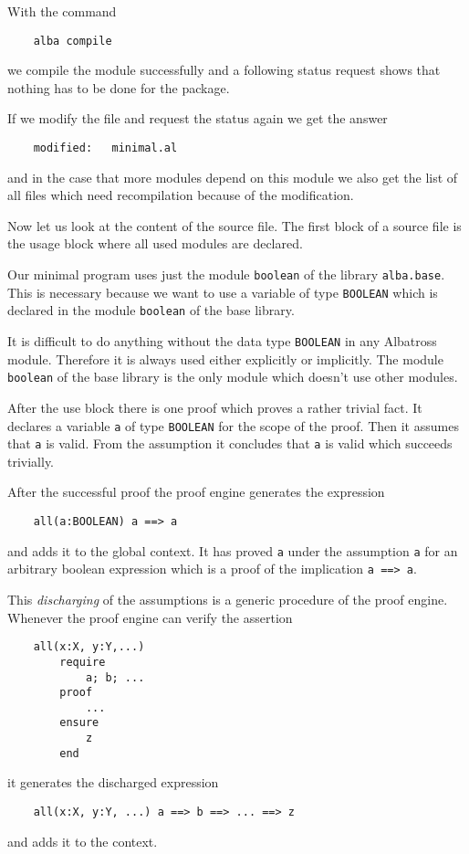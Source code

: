 With the command
\begin{lstlisting}
    alba compile
\end{lstlisting}
we compile the module successfully and a following status request shows that
nothing has to be done for the package.

If we modify the file and request the status again we get the answer
\begin{lstlisting}
    modified:   minimal.al
\end{lstlisting}
and in the case that more modules depend on this module we also get the list
of all files which need recompilation because of the modification.

Now let us look at the content of the source file. The first block of a source
file is the usage block where all used modules are declared.

Our minimal program uses just the module \lstinline!boolean! of the library
\lstinline!alba.base!. This is necessary because we want to use a variable of
type \lstinline!BOOLEAN! which is declared in the module \lstinline!boolean!
of the base library.

It is difficult to do anything without the data type \lstinline!BOOLEAN! in any
Albatross module. Therefore it is always used either explicitly or
implicitly. The module \lstinline!boolean! of the base library is the only
module which doesn't use other modules.

After the use block there is one proof which proves a rather trivial fact. It
declares a variable \lstinline!a! of type \lstinline!BOOLEAN! for the scope of
the proof. Then it assumes that \lstinline!a! is valid. From the assumption it
concludes that \lstinline!a! is valid which succeeds trivially.

After the successful proof the proof engine generates the expression
\begin{lstlisting}
    all(a:BOOLEAN) a ==> a
\end{lstlisting}
and adds it to the global context. It has proved \lstinline!a! under the
assumption \lstinline!a!  for an arbitrary boolean expression which is a proof
of the implication \lstinline!a ==> a!.

This {\em discharging} of the assumptions is a generic procedure of the proof
engine. Whenever the proof engine can verify the assertion
\begin{lstlisting}
    all(x:X, y:Y,...)
        require
            a; b; ...
        proof
            ...
        ensure
            z
        end
\end{lstlisting}
it generates the discharged expression
\begin{lstlisting}
    all(x:X, y:Y, ...) a ==> b ==> ... ==> z
\end{lstlisting}
and adds it to the context.

